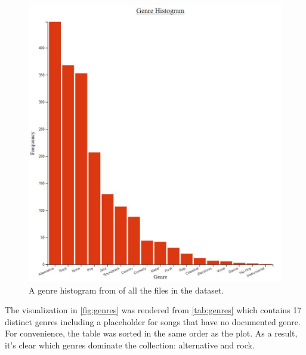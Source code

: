 \documentclass[journal]{vgtc}                %
\begin{document}
\begin{figure}[h]
 \centering %
 \includegraphics[width=\columnwidth]{genre-histogram}
 \caption{A genre histogram from \cite{Grifski:2019} of all the files in the dataset.}
 \label{fig:genres}
\end{figure}

The visualization in \autoref{fig:genres} was rendered from \autoref{tab:genres}
which contains 17 distinct genres including a placeholder for songs that have
no documented genre. For convenience, the table was sorted in the same order
as the plot. As a result, it's clear which genres dominate the collection:
alternative and rock.
\end{document}
